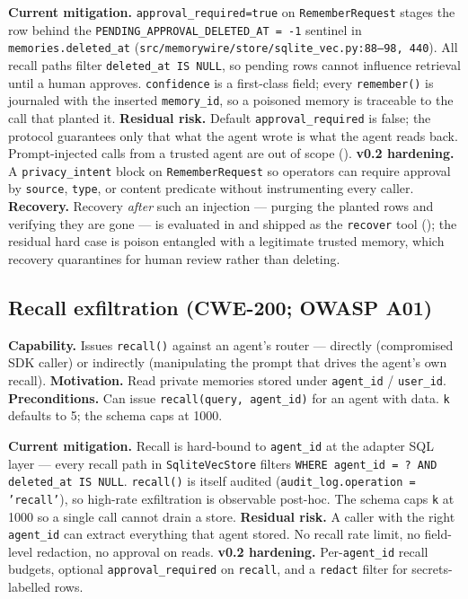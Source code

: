 \documentclass[11pt,letterpaper,twocolumn]{article}
\begin{document}
\textbf{Current mitigation.} \texttt{approval\_required=true} on \texttt{RememberRequest} stages the row behind the \texttt{PENDING\_APPROVAL\_DELETED\_AT = -1} sentinel in \texttt{memories.deleted\_at} (\texttt{src/memorywire/store/sqlite\_vec.py:88--98, 440}). All recall paths filter \texttt{deleted\_at IS NULL}, so pending rows cannot influence retrieval until a human approves. \texttt{confidence} is a first-class field; every \texttt{remember()} is journaled with the inserted \texttt{memory\_id}, so a poisoned memory is traceable to the call that planted it. \textbf{Residual risk.} Default \texttt{approval\_required} is false; the protocol guarantees only that what the agent wrote is what the agent reads back. Prompt-injected calls from a trusted agent are out of scope (). \textbf{v0.2 hardening.} A \texttt{privacy\_intent} block on \texttt{RememberRequest} so operators can require approval by \texttt{source}, \texttt{type}, or content predicate without instrumenting every caller. \textbf{Recovery.} Recovery \emph{after} such an injection --- purging the planted rows and verifying they are gone --- is evaluated in  and shipped as the \texttt{recover} tool (); the residual hard case is poison entangled with a legitimate trusted memory, which recovery quarantines for human review rather than deleting.

\subsection{Recall exfiltration (CWE-200; OWASP A01)}
\label{sec:threats-exfiltration}

\textbf{Capability.} Issues \texttt{recall()} against an agent's router --- directly (compromised SDK caller) or indirectly (manipulating the prompt that drives the agent's own recall). \textbf{Motivation.} Read private memories stored under \texttt{agent\_id} / \texttt{user\_id}. \textbf{Preconditions.} Can issue \texttt{recall(query, agent\_id)} for an agent with data. \texttt{k} defaults to 5; the schema caps at 1000.

\textbf{Current mitigation.} Recall is hard-bound to \texttt{agent\_id} at the adapter SQL layer --- every recall path in \texttt{SqliteVecStore} filters \texttt{WHERE agent\_id = ? AND deleted\_at IS NULL}. \texttt{recall()} is itself audited (\texttt{audit\_log.operation = 'recall'}), so high-rate exfiltration is observable post-hoc. The schema caps \texttt{k} at 1000 so a single call cannot drain a store. \textbf{Residual risk.} A caller with the right \texttt{agent\_id} can extract everything that agent stored. No recall rate limit, no field-level redaction, no approval on reads. \textbf{v0.2 hardening.} Per-\texttt{agent\_id} recall budgets, optional \texttt{approval\_required} on \texttt{recall}, and a \texttt{redact} filter for secrets-labelled rows.
\end{document}
